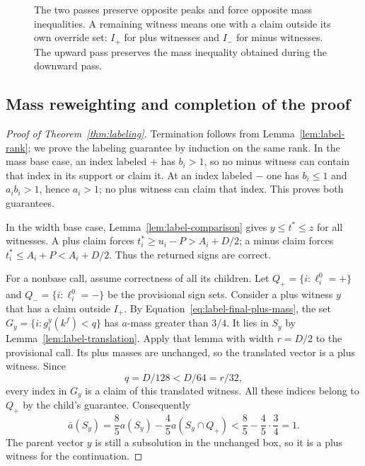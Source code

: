 \begin{figure}[!htb]
 \centering
 
 \caption{The two passes preserve opposite peaks and force opposite
 mass inequalities.  A remaining witness means one with a claim
 outside its own override set: $I_+$ for plus witnesses and $I_-$
 for minus witnesses.  The upward pass preserves the mass inequality
 obtained during the downward pass.}
 \label{fig:labeling-passes}
\end{figure}

\subsection{Mass reweighting and completion of the proof}

\begin{proof}[Proof of Theorem~\ref{thm:labeling}]
Termination follows from Lemma~\ref{lem:label-rank}; we prove the
labeling guarantee by induction on the same rank.  In the mass
base case, an index labeled $+$ has $b_i>1$, so no minus witness
can contain that index in its support or claim it.  At an index
labeled $-$ one has $b_i\le1$ and $a_i b_i>1$, hence $a_i>1$;
no plus witness can claim that index.  This proves both guarantees.

In the width base case, Lemma~\ref{lem:label-comparison} gives
$y\le t^*\le z$ for all witnesses.  A plus claim forces
$t_i^*\ge u_i-P>A_i+D/2$; a minus claim forces
$t_i^*\le A_i+P<A_i+D/2$.  Thus the returned signs are correct.

For a nonbase call, assume correctness of all its children.  Let
$Q_+=\{i:\ell_i^0=+\}$ and $Q_-=\{i:\ell_i^0=-\}$ be the
provisional sign sets.  Consider a plus witness $y$ that has a
claim outside $I_+$.  By Equation~\eqref{eq:label-final-plus-mass},
the set $G_y=\{i:g_i^y(k^f)<q\}$ has $a$-mass greater than
$3/4$.  It lies in $S_y$ by Lemma~\ref{lem:label-translation}.
Apply that lemma with width $r=D/2$ to the provisional call.
Its plus masses are unchanged, so the translated vector is a
plus witness.  Since
\[
 q=D/128<D/64=r/32,
\]
every index in $G_y$ is a claim of this translated witness.
All these indices belong to $Q_+$ by the child's guarantee.
Consequently
\begin{equation}
 \bar a(S_y)
   =\frac85 a(S_y)-\frac45 a(S_y\cap Q_+)
   <\frac85-\frac45\cdot\frac34=1.
 \label{eq:label-plus-survives}
\end{equation}
The parent vector $y$ is still a subsolution in the unchanged box,
so it is a plus witness for the continuation.


\end{proof}
